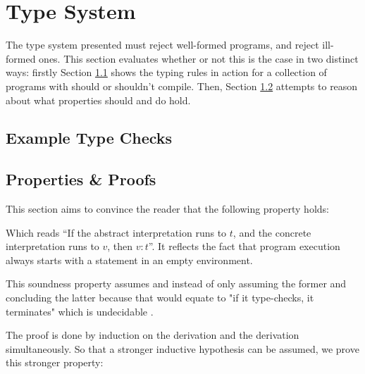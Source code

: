 \documentclass[12pt,twoside]{report}
\begin{document}
\section{Type System}
\label{section:typesystem}
The type system presented must reject well-formed programs, and reject ill-formed ones. This section evaluates whether or not this is the case in two distinct ways: firstly Section \ref{section:examplechecks} shows the typing rules in action for a collection of programs with should or shouldn't compile. Then, Section \ref{section:properties} attempts to reason about what properties should and do hold.

\subsection{Example Type Checks}
\label{section:examplechecks}

\subsection{Properties \& Proofs}
\label{section:properties}
This section aims to convince the reader that the following property holds:


Which reads ``If the abstract interpretation runs to $t$, and the concrete interpretation runs to $v$, then $v:t$''. It reflects the fact that program execution always starts with a statement in an empty environment.

This soundness property assumes \movearrowabs and \movearrowconc instead of only assuming the former and concluding the latter because that would equate to "if it type-checks, it terminates" which is undecidable \citep{turingComputableNumbersApplication1937}.

The proof is done by induction on the \movearrowabs derivation and the \movearrowconc derivation simultaneously. So that a stronger inductive hypothesis can be assumed, we prove this stronger property:
\end{document}
